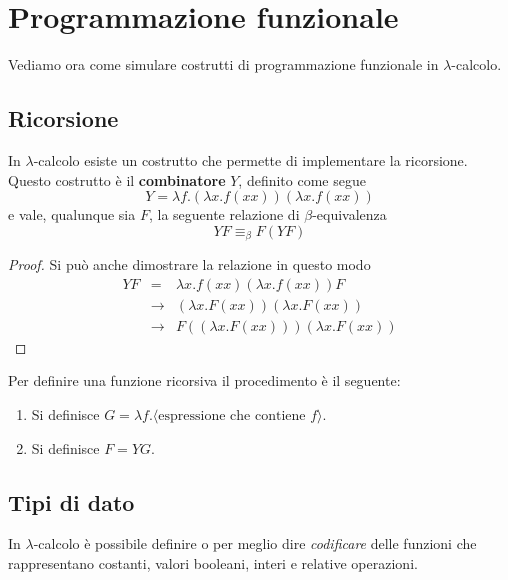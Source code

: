 ﻿\section{Programmazione funzionale}
Vediamo ora come simulare costrutti di programmazione funzionale in $\lambda$-calcolo.

\subsection{Ricorsione}
In $\lambda$-calcolo esiste un costrutto che permette di implementare la ricorsione. Questo costrutto è il
\textbf{combinatore} $Y$, definito come segue
\[ Y = \lambda f.(\lambda x.f(x x)) (\lambda x.f(x x)) \]
e vale, qualunque sia $F$, la seguente relazione di $\beta$-equivalenza
\[ Y F \equiv_\beta F (Y F) \]
\begin{proof}
	Si può anche dimostrare la relazione in questo modo
	\[
		\begin{array}{rcl}
			Y F & =           & \lambda x.f(x x) (\lambda x.f(x x)) F     \\
			    & \rightarrow & (\lambda x. F (x x)) (\lambda x.F(x x))   \\
			    & \rightarrow & F ((\lambda x.F(x x))) (\lambda x.F(x x))
		\end{array}
	\]
\end{proof}
Per definire una funzione ricorsiva il procedimento è il seguente:
\begin{enumerate}
	\item Si definisce $G = \lambda f.\langle \text{espressione che contiene } f \rangle$.
	\item Si definisce $F = Y G$.
\end{enumerate}

\subsection{Tipi di dato}
In $\lambda$-calcolo è possibile definire o per meglio dire \emph{codificare} delle funzioni che rappresentano
costanti, valori booleani, interi e relative operazioni.

